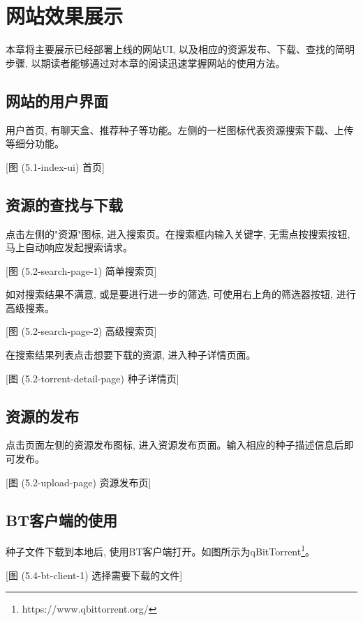 \chapter{网站效果展示}

本章将主要展示已经部署上线的网站UI, 以及相应的资源发布、下载、查找的简明步骤, 以期读者能够通过对本章的阅读迅速掌握网站的使用方法。

\section{网站的用户界面}

用户首页, 有聊天盒、推荐种子等功能。左侧的一栏图标代表资源搜索下载、上传等细分功能。

[图 (5.1-index-ui) 首页]

\section{资源的查找与下载}

点击左侧的"资源"图标, 进入搜索页。在搜索框内输入关键字, 无需点按搜索按钮, 马上自动响应发起搜索请求。

[图 (5.2-search-page-1) 简单搜索页]

如对搜索结果不满意, 或是要进行进一步的筛选, 可使用右上角的筛选器按钮, 进行高级搜素。

[图 (5.2-search-page-2) 高级搜索页]

在搜索结果列表点击想要下载的资源, 进入种子详情页面。

[图 (5.2-torrent-detail-page) 种子详情页]

\section{资源的发布}

点击页面左侧的资源发布图标, 进入资源发布页面。输入相应的种子描述信息后即可发布。

[图 (5.2-upload-page) 资源发布页]

\section{BT客户端的使用}

种子文件下载到本地后, 使用BT客户端打开。如图所示为qBitTorrent\footnote{https://www.qbittorrent.org/}。

[图 (5.4-bt-client-1) 选择需要下载的文件]


